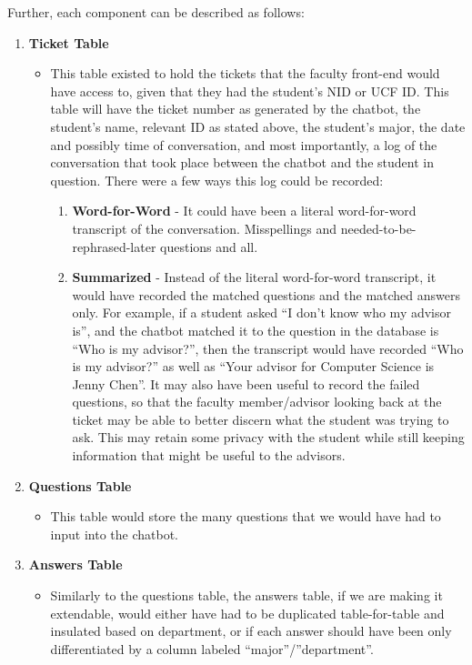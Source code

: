 \documentclass[titlepage, 12pt]{article}
\begin{document}
Further, each component can be described as follows:

\begin{enumerate}
    \item \textbf{Ticket Table}
    \begin{itemize}
        \item This table existed to hold the tickets that the faculty front-end would have access to, given that they had the student’s NID or UCF ID. This table will have the ticket number as generated by the chatbot, the student’s name, relevant ID as stated above, the student’s major, the date and possibly time of conversation, and most importantly, a log of the conversation that took place between the chatbot and the student in question. There were a few ways this log could be recorded:
        \begin{enumerate}
            \item \textbf{Word-for-Word} - It could have been a literal word-for-word transcript of the conversation. Misspellings and needed-to-be-rephrased-later questions and all.
            \item \textbf{Summarized} - Instead of the literal word-for-word transcript, it would have recorded the matched questions and the matched answers only. For example, if a student asked “I don’t know who my advisor is”, and the chatbot matched it to the question in the database is “Who is my advisor?”, then the transcript would have recorded “Who is my advisor?” as well as “Your advisor for Computer Science is Jenny Chen”. It may also have been useful to record the failed questions, so that the faculty member/advisor looking back at the ticket may be able to better discern what the student was trying to ask. This may retain some privacy with the  student while still keeping information that might be useful to the advisors.
        \end{enumerate}
    \end{itemize}
    \item \textbf{Questions Table}
    \begin{itemize}
        \item This table would store the many questions that we would have had to input into the chatbot.
    \end{itemize}
    \item \textbf{Answers Table}
    \begin{itemize}
        \item Similarly to the questions table, the answers table, if we are making it extendable, would either have had to be duplicated table-for-table and insulated based on department, or if each answer should have been only differentiated by a column labeled “major”/”department”.

\end{itemize}
\end{enumerate}
\end{document}
